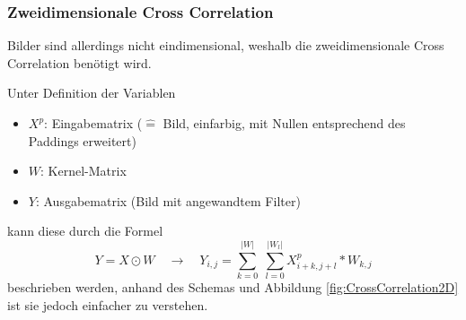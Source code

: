 \documentclass[12pt,a4]{article}
\begin{document}
\subsubsection{Zweidimensionale Cross Correlation}\label{sec:CrossCorrelation2D}
Bilder sind allerdings nicht eindimensional, weshalb die zweidimensionale Cross Correlation benötigt wird. 

Unter Definition der Variablen
\begin{itemize}
\item $X^p$: Eingabematrix ($\hat{=}$ Bild, einfarbig, mit Nullen entsprechend des Paddings erweitert)
\item $W$: Kernel-Matrix
\item $Y$: Ausgabematrix (Bild mit angewandtem Filter)
\end{itemize}
kann diese durch die Formel
\begin{equation}
Y = X \odot W \quad \rightarrow \quad Y_{i, j} = \sum\limits_{k=0}^{|W|} \; \sum\limits_{l=0}^{|W_l|} X^p_{i+k, j+l} * W_{k, j}
\end{equation}
beschrieben werden, anhand des Schemas und Abbildung \ref{fig:CrossCorrelation2D} ist sie jedoch einfacher zu verstehen.
\end{document}
